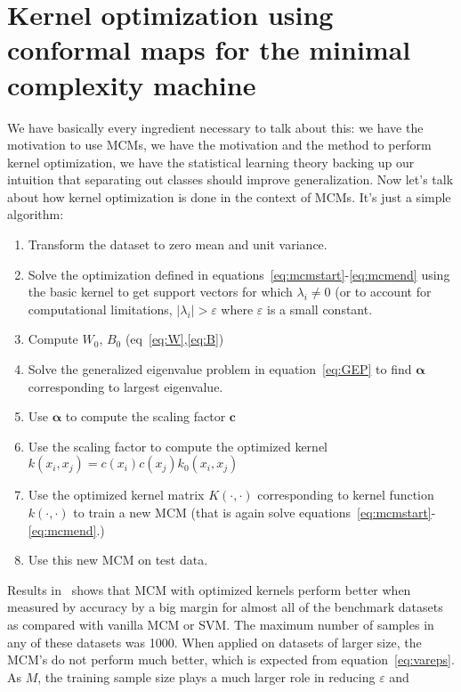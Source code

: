 \documentclass[11pt]{article}
\begin{document}
\section{Kernel optimization using conformal maps for the minimal complexity
machine~\cite{keropt}}
We have basically every ingredient necessary to talk about this: we have the
motivation to use MCMs, we have the motivation and the method to perform
kernel optimization, we have the statistical learning theory backing up our
intuition that separating out classes should improve generalization. Now let's talk about how
kernel optimization is done in the context of MCMs. It's just a simple
algorithm:
\begin{enumerate}
    \item Transform the dataset to zero mean and unit variance.
    \item Solve the optimization defined in
        equations~\ref{eq:mcmstart}\nobreakdash-\ref{eq:mcmend} using the basic kernel to
        get support vectors for which $\lambda_i \ne 0$ (or to account for
        computational limitations, $\lvert\lambda_i\rvert > \varepsilon$ where
        $\varepsilon$ is a small constant.
    \item Compute $W_0$, $B_0$ (eq~\ref{eq:W},\ref{eq:B})
    \item Solve the generalized eigenvalue problem in equation~\ref{eq:GEP} to
        find $\mathbf{\alpha}$ corresponding to largest eigenvalue.
    \item Use $\mathbf{\alpha}$ to compute the scaling factor $\mathbf{c}$
    \item Use the scaling factor to compute the optimized kernel
        $k(x_i,x_j)=c(x_i)c(x_j)k_0(x_i,x_j)$
    \item Use the optimized kernel matrix $K(\cdot,\cdot)$ corresponding to
        kernel function $k(\cdot,\cdot)$ to train a new MCM (that is again solve
        equations~\ref{eq:mcmstart}\nobreakdash-\ref{eq:mcmend}.)
    \item Use this new MCM on test data.
\end{enumerate}
\par
Results in~\cite{keropt} shows that MCM with optimized kernels perform better when
measured by accuracy by a big margin for almost all of the benchmark datasets as
compared with vanilla MCM or SVM.  The maximum number of samples in any of these
datasets was 1000. When applied on datasets of larger size, the MCM's do not
perform much better, which is expected from equation~\ref{eq:vareps}. As $M$,
the training sample size plays a much larger role in reducing $\varepsilon$ and
\end{document}
